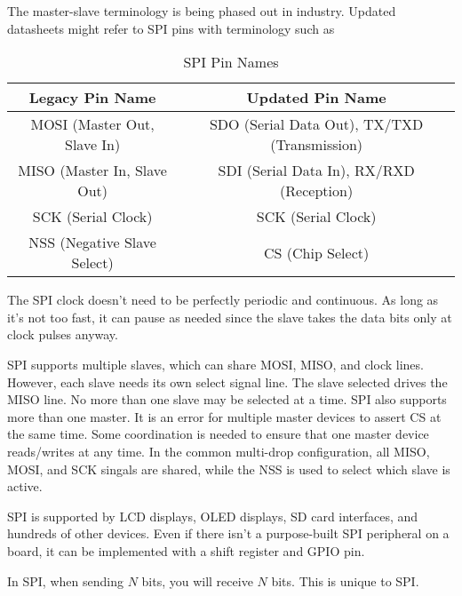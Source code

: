 The master-slave terminology is being
phased out in industry. Updated datasheets
might refer to SPI pins with terminology such as
\begin{table}[h!]
    \centering
    \begin{tabular}{|c|c|}
        \hline
        \textbf{Legacy Pin Name}    & \textbf{Updated Pin Name}                    \\ \hline
        MOSI (Master Out, Slave In) & SDO (Serial Data Out), TX/TXD (Transmission) \\ \hline
        MISO (Master In, Slave Out) & SDI (Serial Data In), RX/RXD (Reception)     \\ \hline
        SCK (Serial Clock)          & SCK (Serial Clock)                           \\ \hline
        NSS (Negative Slave Select) & CS (Chip Select)                             \\ \hline
    \end{tabular}
    \caption{SPI Pin Names}
    \label{tab:spi_pin_names}
\end{table}

The SPI clock doesn't need to be perfectly
periodic and continuous. As long as it's not
too fast, it can pause as needed since
the slave takes the data bits only
at clock pulses anyway.

SPI supports multiple slaves, which can share
MOSI, MISO, and clock lines. However,
each slave needs its own select signal line.
The slave selected drives the MISO line. No
more than one slave may be selected at a
time. SPI also supports more than one
master. It is an error for multiple master
devices to assert CS at the same time.
Some coordination is needed to ensure
that one master device reads/writes at any time.
In the common multi-drop configuration,
all MISO, MOSI, and SCK singals are shared,
while the NSS is used to select which slave
is active.

SPI is supported by LCD displays,
OLED displays, SD card interfaces, and
hundreds of other devices. Even if there
isn't a purpose-built SPI peripheral
on a board, it can be implemented with
a shift register and GPIO pin.

In SPI, when sending $N$ bits, you will
receive $N$ bits. This is unique to SPI.

